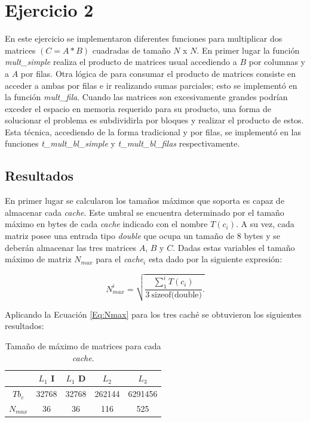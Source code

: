 \documentclass[11pt]{article}
\begin{document}
\section*{Ejercicio 2}
En este ejercicio se implementaron diferentes funciones para multiplicar dos matrices $(C=A*B)$ cuadradas de tamaño $N$ x $N$. En primer lugar la función \emph{mult\_simple} realiza el producto de matrices usual accediendo a $B$ por columnas y a $A$ por filas. Otra lógica de para consumar el producto de matrices consiste en acceder a ambas por filas e ir realizando sumas parciales; esto se implementó en la función \emph{mult\_fila}. Cuando las matrices son excesivamente grandes podrían exceder el espacio en memoria requerido para su producto, una forma de solucionar el problema es subdividirla por bloques y realizar el producto de estos. Esta técnica, accediendo de la forma tradicional y por filas, se implementó en las funciones \emph{t\_mult\_bl\_simple} y \emph{t\_mult\_bl\_filas} respectivamente. 

\subsection*{Resultados}
En primer lugar se calcularon los tamaños máximos que soporta es capaz de almacenar cada \emph{cache}. Este umbral se encuentra determinado por el tamaño máximo en bytes de cada \emph{cache} indicado con el nombre $T(c_i)$. A su vez, cada matriz posee una entrada tipo \emph{double} que ocupa un tamaño de 8 bytes y se deberán almacenar las tres matrices $ A $, $B$ y $C$. Dadas estas variables el tamaño máximo de matriz $N_{max}$ para el \emph{cache$_i$} esta dado por la siguiente expresión:

\begin{equation}\label{Eq:Nmax}
    N_{max}^i=\sqrt{\frac{\sum _1^i T(c_i)}{3 ~\text{sizeof(double)}}.}    
\end{equation}

\newpage
Aplicando la Ecuación \eqref{Eq:Nmax} para los tres caché se obtuvieron los siguientes resultados:
\begin{table}[h]
    \centering
    \begin{tabular}{||c|c|c|c|c||}
        \hline
           &$L_1$ I  &$L_1$ D & $L_2$ & $L_3$  \\[0.5ex]  \hline\hline
        $Tb_c$      & 32768 & 32768 & 262144 & 6291456   \\
        $N_{max}$    & 36       & 36         & 116 & 525        \\    \hline
    \end{tabular}
    \caption{Tamaño de máximo de matrices para cada \emph{cache}. }
    \label{Tab:Ej2:Nmax}
\end{table}
\end{document}
